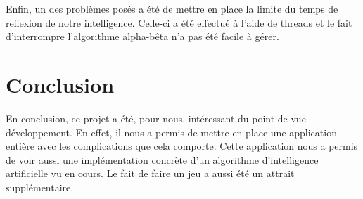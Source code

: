 \documentclass[11pt,a4paper]{article}
\begin{document}
Enfin, un des problèmes posés a été de mettre en place la limite du temps de
reflexion de notre intelligence. Celle-ci a été effectué à l'aide de threads et
le fait d'interrompre l'algorithme alpha-bêta n'a pas été facile à gérer.
 \clearpage	
\section{Conclusion}
En conclusion, ce projet a été, pour nous, intéressant du point de vue
développement. En effet, il nous a permis de mettre en place une application
entière avec les complications que cela comporte. Cette application nous a
permis de voir aussi une implémentation concrète d'un algorithme d'intelligence
artificielle vu en cours. Le fait de faire un jeu a aussi été un attrait
supplémentaire.
\end{document}
